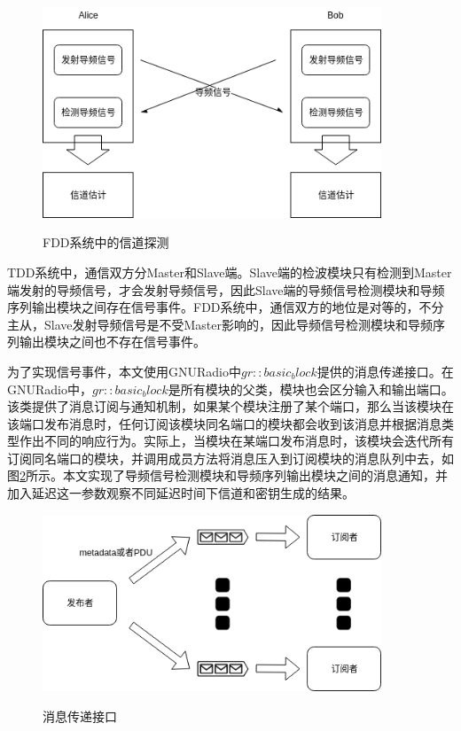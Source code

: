\documentclass[master]{seuthesis} %
\begin{document}
\begin{Main}
\begin{figure}
    \centering
    \includegraphics[width=0.9\textwidth]{images/two_tranceiver_structure_fdd}
    \caption{FDD系统中的信道探测}{} 
    \label{two_tranceiver_structure_fdd}
\end{figure}

TDD系统中，通信双方分Master和Slave端。Slave端的检波模块只有检测到Master端发射的导频信号，才会发射导频信号，因此Slave端的导频信号检测模块和导频序列输出模块之间存在信号事件。FDD系统中，通信双方的地位是对等的，不分主从，Slave发射导频信号是不受Master影响的，因此导频信号检测模块和导频序列输出模块之间也不存在信号事件。

为了实现信号事件，本文使用GNURadio中$gr::basic_block$提供的消息传递接口。在GNURadio中，$gr::basic_block$是所有模块的父类，模块也会区分输入和输出端口。该类提供了消息订阅与通知机制，如果某个模块注册了某个端口，那么当该模块在该端口发布消息时，任何订阅该模块同名端口的模块都会收到该消息并根据消息类型作出不同的响应行为。实际上，当模块在某端口发布消息时，该模块会迭代所有订阅同名端口的模块，并调用成员方法将消息压入到订阅模块的消息队列中去，如图\ref{message_passing}所示。本文实现了导频信号检测模块和导频序列输出模块之间的消息通知，并加入延迟这一参数观察不同延迟时间下信道和密钥生成的结果。

\begin{figure}
    \centering
    \includegraphics[width=0.9\textwidth]{images/message_passing}
    \caption{消息传递接口}{} 
    \label{message_passing}
\end{figure}


\end{Main}
\end{document}
